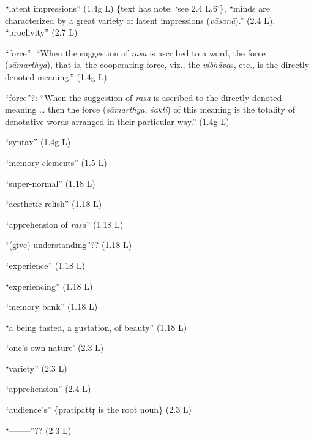 \documentclass[10pt]{article}
\begin{document}
\begin{multicols}{2}
\begin{enumerate}[
			leftmargin=0em,
			rightmargin=0em,
		]
		 ``latent impressions'' (1.4g L) \{text has note: `see 2.4 L.6'\},
		``minds are characterized by a great variety of latent impressions (\textit{vāsanā}).'' (2.4 L),
		``proclivity'' (2.7 L)

		 ``force'': ``When the suggestion of \textit{rasa} is ascribed to a word, the force (\textit{sāmarthya}), that is, the cooperating force, viz., the \textit{vibhāva}s, etc., is the directly denoted meaning.'' (1.4g L)

		 ``force''?: ``When the suggestion of \textit{rasa} is ascribed to the directly denoted meaning \dots
		then the force (\textit{sāmarthya}, \textit{śakti}) of this meaning is the totality of denotative words arranged in their particular way.'' (1.4g L)

		 ``syntax'' (1.4g L)

		\litem{-------} ``memory elements'' (1.5 L)

		 ``super-normal'' (1.18 L)

		 ``aesthetic relish'' (1.18 L)

		 ``apprehension of \textit{rasa}'' (1.18 L)

		 ``(give) understanding''?? (1.18 L)

		 ``experience'' (1.18 L)

		 ``experiencing'' (1.18 L)

		 ``memory bank'' (1.18 L)

		 ``a being tasted, a gustation, of beauty'' (1.18 L)

		 ``one's own nature' (2.3 L)

		 ``variety'' (2.3 L)

		 ``apprehension'' (2.4 L)

		 ``audience's'' \{pratipattṛ is the root noun\} (2.3 L)

		 ``--------''?? (2.3 L)


\end{enumerate}
\end{multicols}
\end{document}
